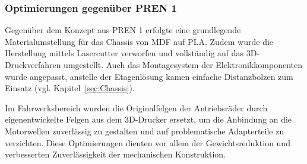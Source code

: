 \documentclass[main.tex]{subfiles} %
\begin{document}

\subsubsection{Optimierungen gegenüber PREN 1}

Gegenüber dem Konzept aus PREN 1 erfolgte eine grundlegende Materialumstellung 
für das Chassis von MDF auf PLA. Zudem wurde die Herstellung mittels Lasercutter 
verworfen und vollständig auf das 3D-Druckverfahren umgestellt. Auch das 
Montagesystem der Elektronikkomponenten wurde angepasst, anstelle der Etagenlösung 
kamen einfache Distanzbolzen zum Einsatz (vgl. Kapitel~\ref{sec:Chassis}).

Im Fahrwerksbereich wurden die Originalfelgen der Antriebsräder durch 
eigenentwickelte Felgen aus dem 3D-Drucker ersetzt, um die Anbindung an die 
Motorwellen zuverlässig zu gestalten und auf problematische Adapterteile zu 
verzichten. Diese Optimierungen dienten vor allem der Gewichtsreduktion und 
verbesserten Zuverlässigkeit der mechanischen Konstruktion.
\end{document}
